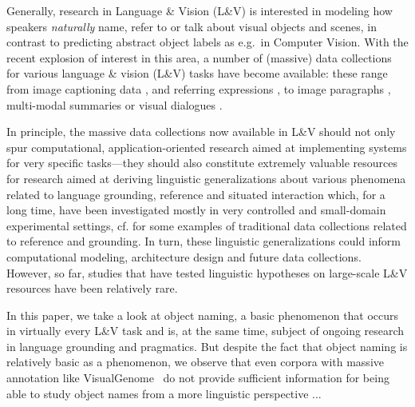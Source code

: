 Generally, research in Language \& Vision (L\&V) is interested in modeling how speakers \textit{naturally} name, refer to or talk about visual objects and scenes, in contrast to predicting abstract object labels as e.g.\ in Computer Vision. With the recent explosion of interest in this area, a number of (massive) data collections for various language \& vision (L\&V) tasks have become available: these range from image captioning data \cite{fangetal:2015,devlin:imcaqui,Bernardietal:automatic}, and referring expressions \cite{Kazemzadeh2014,mao15,Yu2016}, to image paragraphs , multi-modal summaries or visual dialogues \cite{das2017visual,vries2017guesswhat}.

In principle, the massive data collections now available in L\&V should not only spur computational, application-oriented research aimed at implementing systems for very specific tasks---they should also constitute extremely valuable resources for research aimed at deriving linguistic generalizations about various phenomena related to language grounding, reference and situated interaction which, for a long time, have been investigated mostly in very controlled and small-domain experimental settings, cf. \cite{anderson1991hcrc,fernangen:sigd07,krahmer:2012,takenobu2012rex,zarriess2016pentoref} for some examples of traditional data collections related to reference and grounding.  
In turn, these linguistic generalizations could inform computational modeling, architecture design and future data collections.
However, so far, studies that have tested linguistic hypotheses on large-scale L\&V resources have been relatively rare. 

In this paper, we take a look at object naming, a basic phenomenon that occurs in virtually every L\&V task and is, at the same time, subject of ongoing research in language grounding and pragmatics.   But despite the fact that object naming is relatively basic as a phenomenon, we observe that even corpora with massive annotation like VisualGenome~\cite[\vg henceforth]{krishna2016visualgenome} do not provide sufficient information for being able to study object names from a more linguistic perspective ... 

